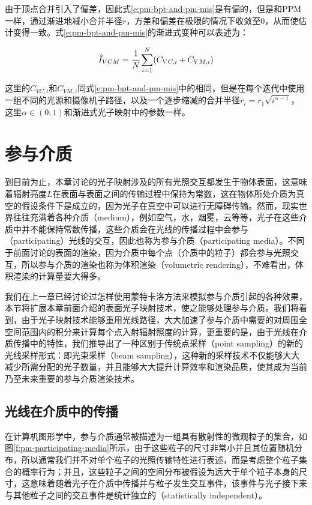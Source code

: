 由于顶点合并引入了偏差，因此式\ref{e:pm-bpt-and-pm-mis}是有偏的，但是和PPM一样，通过渐进地减小合并半径$r$，方差和偏差在极限的情况下收敛至0，从而使估计变得一致。式\ref{e:pm-bpt-and-pm-mis}的渐进式变种可以表述为：

\begin{equation}
	\hat{I}_{VCM}= \cfrac{1}{N}\sum^{N}_{i=1}(C_{VC,i}+C_{VM,i})
\end{equation}

这里的$C_{VC,i}$和$C_{VM,i}$同式\ref{e:pm-bpt-and-pm-mis}中的相同，但是在每个迭代中使用一组不同的光源和摄像机子路径，以及一个逐步缩减的合并半径$r_i=r_1\sqrt{i^{\alpha-1}}$，这里$\alpha\in (0;1)$和渐进式光子映射中的参数一样。





\section{参与介质}\label{sec:pm-participating-media}
到目前为止，本章讨论的光子映射涉及的所有光照交互都发生于物体表面，这意味着辐射亮度$L$在表面与表面之间的传输过程中保持为常数，这在物体所处介质为真空的假设条件下是成立的，因为光子在真空中可以进行无障碍传输。然而，现实世界往往充满着各种介质（medium），例如空气，水，烟雾，云等等，光子在这些介质中并不能保持常数传播，这些介质会在光线的传播过程中会参与（participating）光线的交互，因此也称为参与介质（participating media）。不同于前面讨论的表面的渲染，因为介质中每个点（介质中的粒子）都会参与光照交互，所以参与介质的渲染也称为体积渲染（volumetric rendering），不难看出，体积渲染的计算量要大得多。

我们在上一章已经讨论过怎样使用蒙特卡洛方法来模拟参与介质引起的各种效果，本节将扩展本章前面介绍的表面光子映射技术，使之能够处理参与介质。我们将看到，由于光子映射技术能够重用光线路径，大大加速了参与介质中需要的对周围全空间范围内的积分来计算每个点入射辐射照度的计算，更重要的是，由于光线在介质传播中的特性，我们推导出了一种区别于传统点采样（point sampling）的新的光线采样形式：即光束采样（beam sampling），这种新的采样技术不仅能够大大减少所需分配的光子数量，并且能够大大提升计算效率和渲染品质，使其成为当前乃至未来重要的参与介质渲染技术。




\subsection{光线在介质中的传播}
在计算机图形学中，参与介质通常被描述为一组具有散射性的微观粒子的集合，如图\ref{f:pm-participating-media}所示，由于这些粒子的尺寸非常小并且其位置随机分布，所以通常我们并不对单个粒子的光照传输特性进行表述，而是考虑整个粒子集合的概率行为；并且，这些粒子之间的空间分布被假设为远大于单个粒子本身的尺寸，这意味着随着光子在介质中传播并与粒子发生交互事件，该事件与光子接下来与其他粒子之间的交互事件是统计独立的（statistically independent）。

